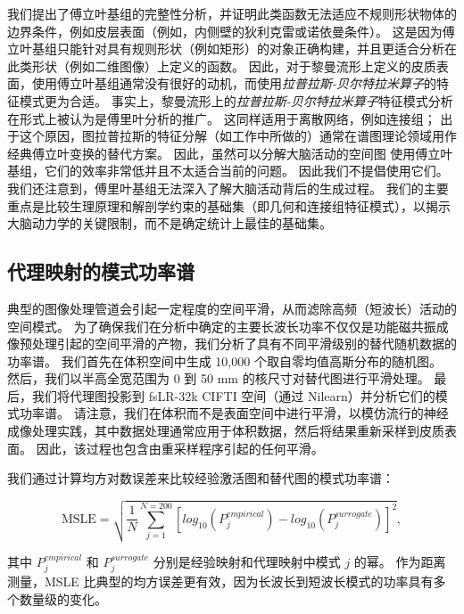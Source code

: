 \documentclass[lang=cn,a4paper,newtx,citestyle=gb7714-2015, bibstyle=gb7714-2015]{elegantpaper}
\begin{document}
我们提出了傅立叶基组的完整性分析，并证明此类函数无法适应不规则形状物体的边界条件，例如皮层表面（例如，内侧壁的狄利克雷或诺依曼条件）\cite{hasson2008hierarchy}。
这是因为傅立叶基组只能针对具有规则形状（例如矩形）的对象正确构建，并且更适合分析在此类形状（例如二维图像）上定义的函数。
因此，对于黎曼流形上定义的皮质表面，使用傅立叶基组通常没有很好的动机，而使用\textit{拉普拉斯-贝尔特拉米算子}的特征模式更为合适\cite{murray2014hierarchy,glasser2011mapping}。
事实上，黎曼流形上的\textit{拉普拉斯-贝尔特拉米算子}特征模式分析在形式上被认为是傅里叶分析\cite{gao2020neuronal}的推广。
这同样适用于离散网络，例如连接组；
出于这个原因，图拉普拉斯的特征分解（如工作中所做的）通常在谱图理论领域用作经典傅立叶变换的替代方案\cite{tian2020topographic}。
因此，虽然可以分解大脑活动的空间图 使用傅立叶基组，它们的效率非常低并且不太适合当前的问题。
因此我们不提倡使用它们。
我们还注意到，傅里叶基组无法深入了解大脑活动背后的生成过程。
我们的主要重点是比较生理原理和解剖学约束的基础集（即几何和连接组特征模式），以揭示大脑动力学的关键限制，而不是确定统计上最佳的基础集。





\subsection{代理映射的模式功率谱} \label{sec:modal_power_spectra}


典型的图像处理管道会引起一定程度的空间平滑，从而滤除高频（短波长）活动的空间模式。
为了确保我们在分析中确定的主要长波长功率不仅仅是功能磁共振成像预处理引起的空间平滑的产物，我们分析了具有不同平滑级别的替代随机数据的功率谱。
我们首先在体积空间中生成 10,000 个取自零均值高斯分布的随机图。
然后，我们以半高全宽范围为 0 到 50 mm 的核尺寸对替代图进行平滑处理。
最后，我们将代理图投影到 fsLR-32k CIFTI 空间（通过 Nilearn）并分析它们的模式功率谱。
请注意，我们在体积而不是表面空间中进行平滑，以模仿流行的神经成像处理实践，其中数据处理通常应用于体积数据，然后将结果重新采样到皮质表面\cite{haak2018connectopic}。
因此，该过程也包含由重采样程序引起的任何平滑。


我们通过计算均方对数误差来比较经验激活图和替代图的模式功率谱：

\begin{equation}\label{eq:MSLE}
	\text{MSLE} = \sqrt{
				\frac{1}{N}
					\sum_{j=1}^{N=200}
					[ log_10 (P_j^{empirical}) - 
					log_10 (P_j^{surrogate}) ] ^2
				},
\end{equation}

其中 $ P_j^{empirical} $ 和 $ P_j^{surrogate} $ 分别是经验映射和代理映射中模式 $ j $ 的幂。
作为距离测量，MSLE 比典型的均方误差更有效，因为长波长到短波长模式的功率具有多个数量级的变化。
\end{document}
